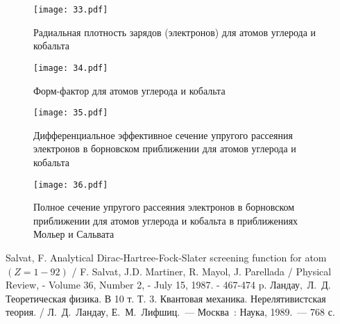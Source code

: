 \documentclass[a4paper,14pt]{extarticle} %
\begin{document}
	\begin{figure}[h!]
		\centering
		\caption{Радиальная плотность зарядов (электронов) для атомов углерода и кобальта}
		\label{ris: 3.3}
		\texttt{[image: 33.pdf]}
	\end{figure}
	
	\begin{figure}[h!]
		\centering
		\caption{Форм-фактор для атомов углерода и кобальта}
		\label{ris: 3.4}
		\texttt{[image: 34.pdf]}
	\end{figure}
	\newpage
		
	\begin{figure}[h!]
		\centering
		\caption{Дифференциальное эффективное сечение упругого рассеяния электронов в борновском приближении для атомов углерода и кобальта}
		\label{ris: 3.5}
		\texttt{[image: 35.pdf]}
	\end{figure}
	
	\begin{figure}[h!]
		\centering
		\caption{Полное сечение упругого рассеяния электронов в борновском приближении для атомов углерода и кобальта в приближениях Мольер и Сальвата}
		\label{ris: 3.6}
		\texttt{[image: 36.pdf]}
	\end{figure}
	
\clearpage
\begin{thebibliography}{10}
 Salvat, F. Analytical Dirac-Hartree-Fock-Slater screening 
function for atom $(Z=1-92)$ / F. Salvat, J.D. Martiner, R. Mayol, J. 
Parellada / Physical Review, - Volume 36, Number 2, - July 15, 1987. - 
467-474 p.
 Ландау,~Л.~Д. Теоретическая физика. В 10 т. Т. 3. Квантовая механика. Нерелятивистская теория. / Л.~Д.~Ландау, Е.~М.~Лифшиц.~--- Москва~: Наука, 1989.~--- 768 с.
\end{thebibliography}
\newpage 
\appendix
\end{document}
